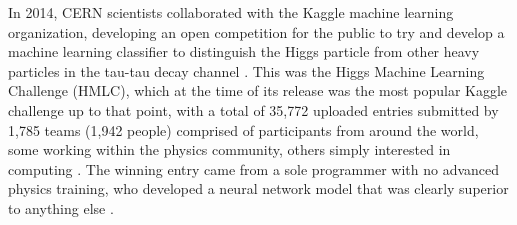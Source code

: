 \documentclass          {article} %
\begin{document}
In 2014, CERN scientists collaborated with the Kaggle machine learning organization, developing an open competition for the public to try and develop a machine learning classifier to distinguish the Higgs particle from other heavy particles in the tau-tau decay channel \cite{???}. This was the Higgs Machine Learning Challenge (HMLC), which at the time of its release was the most popular Kaggle challenge up to that point, with a total of 35,772 uploaded entries submitted by 1,785 teams (1,942 people) comprised of participants from around the world, some working within the physics community, others simply interested in computing \cite{Rousseau2015}. The winning entry came from a sole programmer with no advanced physics training, who developed a neural network model that was clearly superior to anything else \cite{Rousseau2015}.



\end{document}
